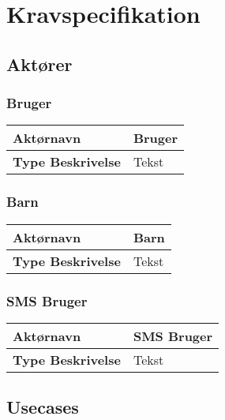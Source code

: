 \chapter{Kravspecifikation}

\section{Aktører}

\subsection{Bruger}
\begin{table}[htbp] \centering
\begin{tabular}{|p{4cm}|p{7cm}|}
	\hline
\textbf{Aktørnavn} &Bruger \\\hline
\textbf{Type Beskrivelse} &
Tekst	
\\\hline
	\end{tabular}
\end{table}

\subsection{Barn}
\begin{table}[htbp] \centering
\begin{tabular}{|p{4cm}|p{7cm}|}
	\hline
\textbf{Aktørnavn} &Barn \\\hline
\textbf{Type Beskrivelse} &
Tekst	
\\\hline
	\end{tabular}
\end{table}

\subsection{SMS Bruger}
\begin{table}[htbp] \centering
\begin{tabular}{|p{4cm}|p{7cm}|}
	\hline
\textbf{Aktørnavn} &SMS Bruger \\\hline
\textbf{Type Beskrivelse} &
Tekst	
\\\hline
	\end{tabular}
\end{table}

\section{Usecases}
